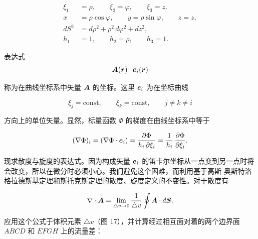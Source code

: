\begin{equation*}
\begin{aligned}
\xi_1 &= \rho, \qquad \xi_2 = \varphi, \qquad \xi_3 = z.\\
x &= \rho \cos\varphi, \qquad y = \rho \sin\varphi, \qquad z = z,\\
dS^{2} &= d\rho^{2} + \rho^{2}\, d\varphi^{2} + dz^{2},\\
h_1 &= 1, \qquad h_2 = \rho, \qquad h_3 = 1.
\end{aligned}
\end{equation*}

表达式
\begin{equation*}
\bm{A}(\bm{r}) \cdot \bm{e}_i(\bm{r})
\end{equation*}

称为在曲线坐标系中矢量 $\bm{A}$ 的坐标。这里 $\bm{e}_i$ 为在坐标曲线

\begin{equation*}
\xi_j = \text{const}, \qquad \xi_k = \text{const}, \qquad j \neq k \neq i
\end{equation*}

方向上的单位矢量。显然，标量函数 $\Phi$ 的梯度在曲线坐标系中等于

\begin{equation*}
(\nabla\Phi)_i = (\nabla\Phi \cdot \bm{e}_i) = \frac{\partial\Phi}{h_i\, \partial\xi_i} = \frac{1}{h_i}\, \frac{\partial\Phi}{\partial\xi_i}.
\end{equation*}

现求散度与旋度的表达式。因为构成矢量 $\bm{e}_i$ 的笛卡尔坐标从一点变到另一点时将会改变，所以在微分时必须小心。我们避免这个困难，而利用基于高斯-奥斯特洛格拉德斯基定理和斯托克斯定理的散度、旋度定义的不变性。对于散度有

\begin{equation*}
\nabla \cdot \bm{A} = \lim_{\triangle v \to 0} \frac{1}{\triangle v} \oint \bm{A} \cdot d\bm{S}.
\end{equation*}

应用这个公式于体积元素 $\triangle v$（图 17），并计算经过相互面对着的两个边界面 $ABCD$ 和 $EFGH$ 上的流量差：

